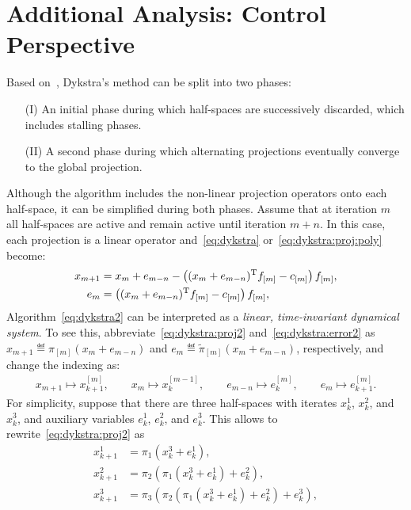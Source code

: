 \documentclass[hidelinks]{article}
\begin{document}
\section{Additional Analysis: Control Perspective}

Based on~\cite{DYKSTRAPERKINS}, Dykstra's method can be split into two phases:
\begin{enumerate}
\item[(I)] An initial phase during which half-spaces are successively discarded, which includes stalling phases.
\item[(II)] A second phase during which alternating projections eventually converge to the global projection.
\end{enumerate}

Although the algorithm includes the non-linear projection operators onto each half-space, it can be simplified during both phases. Assume that at iteration $m$ all half-spaces are active and remain active until iteration $m+n$. In this case, each projection is a linear operator and~\eqref{eq:dykstra} or~\eqref{eq:dykstra:proj:poly} become:
\begin{subequations}\label{eq:dykstra2}
\begin{align}
x_{m+1}&=x_{m}+e_{m-n} - \left((x_{m}+e_{m-n})^{\text{T}} f_{[m]} - c_{[m]}\right) f_{[m]},\label{eq:dykstra:proj2}\\
e_m&=\left((x_{m}+e_{m-n})^{\text{T}} f_{[m]} - c_{[m]}\right) f_{[m]}\label{eq:dykstra:error2},
\end{align}
\end{subequations}
Algorithm~\eqref{eq:dykstra2} can be interpreted as a \textit{linear, time-invariant dynamical system}. To see this, abbreviate~\eqref{eq:dykstra:proj2} and~\eqref{eq:dykstra:error2} as $x_{m+1}\eqdef\pi_{[m]}(x_{m}+e_{m-n})$ and $e_{m}\eqdef\tilde{\pi}_{[m]}(x_{m}+e_{m-n})$, respectively, and change the indexing as:
\begin{align}
x_{m+1} \mapsto x_{k+1}^{[m]},\qquad x_{m} \mapsto x_{k}^{[m-1]},\qquad
e_{m-n} \mapsto e_{k}^{[m]},\qquad e_{m} \mapsto e_{k+1}^{[m]}.
\end{align}
For simplicity, suppose that there are three half-spaces with iterates $x_k^1$, $x_k^2$, and $x_k^3$, and auxiliary variables $e_k^1$, $e_k^2$, and $e_k^3$. This allows to rewrite~\eqref{eq:dykstra:proj2} as
\begin{subequations}
\begin{align}
x_{k+1}^1 &= \pi_1(x_k^3+e_k^1),\\
x_{k+1}^2 &= \pi_2(\pi_1(x_k^3+e_k^1)+e_k^2),\\
x_{k+1}^3 &= \pi_3(\pi_2(\pi_1(x_k^3+e_k^1)+e_k^2)+e_k^3),
\end{align}\label{eq:dykstra:proj3}
\end{subequations}
\end{document}
